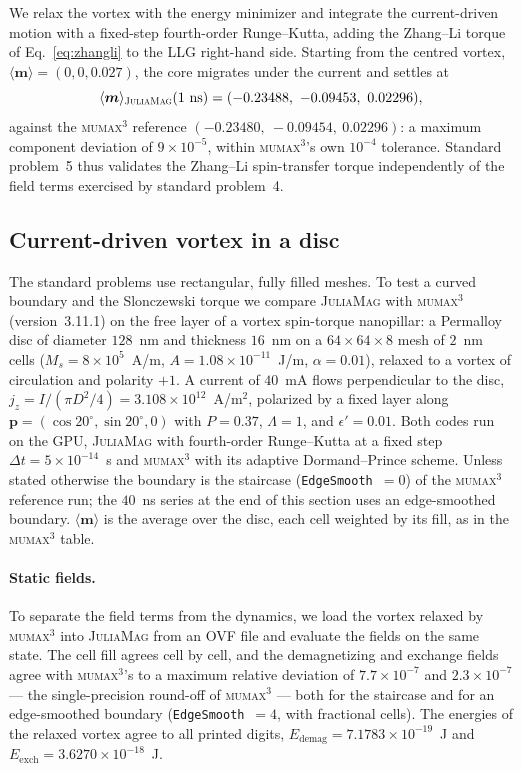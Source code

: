 \documentclass{article}      %
\newcommand{\JuliaMag}{\textsc{JuliaMag}}
\newcommand{\mumax}{\textsc{mumax}$^3$}
\newcommand{\vm}{\bm{m}}
\begin{document}
We relax the vortex with the energy minimizer and integrate the current-driven
motion with a fixed-step fourth-order Runge--Kutta, adding the Zhang--Li torque
of Eq.~\eqref{eq:zhangli} to the LLG right-hand side. Starting from the centred
vortex, $\langle\vm\rangle=(0,0,0.027)$, the core migrates under the current and
settles at
%
\begin{equation}
  \langle\vm\rangle_{\JuliaMag}(1~\mathrm{ns}) = (-0.23488,\ -0.09453,\ 0.02296),
\end{equation}
%
against the \mumax{} reference $(-0.23480,\ -0.09454,\ 0.02296)$: a maximum
component deviation of $9\times10^{-5}$, within \mumax's own $10^{-4}$ tolerance.
Standard problem~5 thus validates the Zhang--Li spin-transfer torque
independently of the field terms exercised by standard problem~4.

\subsection{Current-driven vortex in a disc}
\label{sec:discstt}

The standard problems use rectangular, fully filled meshes. To test a curved
boundary and the Slonczewski torque we compare \JuliaMag{} with \mumax{}
(version~3.11.1) on the free layer of a vortex spin-torque nanopillar: a
Permalloy disc of
diameter $128$~nm and thickness $16$~nm on a $64\times64\times8$ mesh of
$2$~nm cells ($M_s=8\times10^5$~A/m, $A=1.08\times10^{-11}$~J/m,
$\alpha=0.01$), relaxed to a vortex of circulation and polarity $+1$. A current
of $40$~mA flows perpendicular to the disc, $j_z = I/(\pi D^2/4) =
3.108\times10^{12}$~A/m$^2$, polarized by a fixed layer along
$\bm{p}=(\cos20^\circ,\sin20^\circ,0)$ with $P=0.37$, $\Lambda=1$, and
$\epsilon'=0.01$. Both codes run on the GPU, \JuliaMag{} with fourth-order
Runge--Kutta at a fixed step $\Delta t = 5\times10^{-14}$~s and \mumax{} with
its adaptive Dormand--Prince scheme. Unless stated otherwise the boundary is the
staircase (\texttt{EdgeSmooth}~$=0$) of the \mumax{} reference run; the
$40$~ns series at the end of this section uses an edge-smoothed boundary.
$\langle\vm\rangle$ is the average over the disc, each cell weighted by its
fill, as in the \mumax{} table.

\paragraph{Static fields.}
To separate the field terms from the dynamics, we load the vortex relaxed by
\mumax{} into \JuliaMag{} from an OVF file and evaluate the fields on the same
state. The cell fill agrees cell by cell, and the demagnetizing and exchange
fields agree with \mumax's to a maximum relative deviation of
$7.7\times10^{-7}$ and $2.3\times10^{-7}$ --- the single-precision round-off
of \mumax{} --- both for the staircase and for an edge-smoothed boundary
(\texttt{EdgeSmooth}~$=4$, with fractional cells). The energies of the relaxed
vortex agree to all printed digits,
$E_{\mathrm{demag}} = 7.1783\times10^{-19}$~J and
$E_{\mathrm{exch}} = 3.6270\times10^{-18}$~J.
\end{document}
